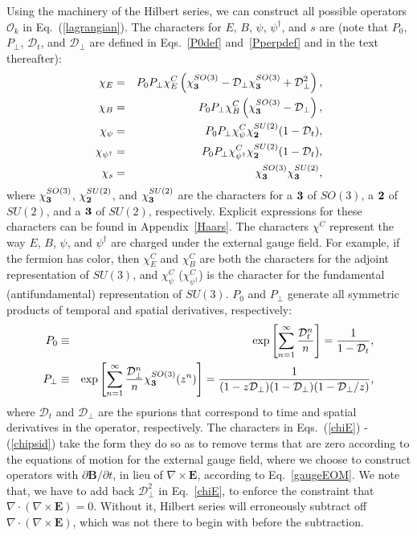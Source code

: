 \documentclass[prd,onecolumn, nofootinbib, 11pt]{revtex4}
\begin{document}
Using the machinery of the Hilbert series, we can construct all possible operators $\mathcal{O}_k$ in Eq.~(\ref{lagrangian}).  The characters for $E$, $B$, $\psi$, $\psi^\dagger$, and $s$ are (note that $P_0$, $P_\perp$, $\mathcal{D}_t$, and $\mathcal{D}_\perp$ are defined in Eqs.~\eqref{P0def} and~\eqref{Pperpdef} and in the text thereafter):
%
\begin{eqnarray}
\label{chiE}
\chi_E &=& P_0 P_\perp\chi^C_E \left( \chi_{\bf 3}^{SO(3)} -  \mathcal{D}_\perp \chi_{\bf 3}^{SO(3)} + \mathcal{D}_\perp^2 \right) ,\\
\label{chiB}
\chi_B&=& P_0 P_\perp \chi^C_B  \left( \chi_{\bf 3}^{SO(3)} -  \mathcal{D}_\perp \right) , \\
\label{chipsi}
\chi_\psi &=& P_0 P_\perp \chi^C_\psi \chi_{\bf 2}^{SU(2)} (1-\mathcal{D}_t) , \\
\label{chipsid}
\chi_{\psi^\dagger} &=& P_0 P_\perp \chi^{C}_{\psi^\dagger}  \chi_{\bf 2}^{SU(2)} (1-\mathcal{D}_t) , \\
\chi_s &=& \chi_{\bf 3}^{SO(3)} \chi_{\bf 3}^{SU(2)} ,
\end{eqnarray}
%
where $\chi_{\bf 3}^{SO(3)}$, $\chi_{\bf 2}^{SU(2)}$, and $\chi_{\bf 3}^{SU(2)}$ are the characters for a ${\bf 3}$ of $SO(3)$, a ${\bf 2}$ of $SU(2)$, and a ${\bf 3}$ of $SU(2)$, respectively.  Explicit expressions for these characters can be found in Appendix~\ref{Haars}.  The characters $\chi^C$ represent the way $E$, $B$, $\psi$, and $\psi^\dagger$ are charged under the external gauge field.  For example, if the fermion has color, then $\chi^C_E$ and $\chi^C_B$ are both the characters for the adjoint representation of $SU(3)$, and $\chi^C_\psi$ ($\chi^C_{\psi^\dagger}$) is the character for the fundamental (antifundamental) representation of $SU(3)$.  
$P_0$ and $P_\perp$ generate all symmetric products of temporal and spatial derivatives, respectively:
%
\begin{eqnarray}
\label{P0def}
P_0 &\equiv& \exp\left[ \displaystyle \sum_{n=1}^\infty \frac{\mathcal{D}_t^n}{n}  \right] = \frac{1}{1-\mathcal{D}_t} , \\
\label{Pperpdef}
P_\perp &\equiv& \exp\left[ \displaystyle \sum_{n=1}^\infty \frac{\mathcal{D}_\perp^n}{n} \chi_{\bf 3}^{SO(3)}(z^n) \right] = \frac{1}{(1-z\mathcal{D}_\perp)(1-\mathcal{D}_\perp)(1-\mathcal{D}_\perp/z)} ,
\end{eqnarray}
%
where $\mathcal{D}_t$ and $\mathcal{D}_\perp$ are the spurions that correspond to time and spatial derivatives in the operator, respectively.  The characters in Eqs.~(\ref{chiE}) - (\ref{chipsid}) take the form they do so as to remove terms that are zero according to the equations of motion for the external gauge field, where we choose to construct operators with $\partial \bm{B}/\partial t$, in lieu of $\nabla \times \bm{E}$, according to Eq.~\eqref{gaugeEOM}. We note that, we have to add back $\mathcal{D}_{\perp}^{2}$ in Eq.~\eqref{chiE}, to enforce the constraint that $\nabla \cdot \left(\nabla \times \bm{E}\right)=0$.  Without it, Hilbert series will erroneously subtract off $\nabla \cdot \left(\nabla \times \bm{E}\right)$, which was not there to begin with before the subtraction.
\end{document}
